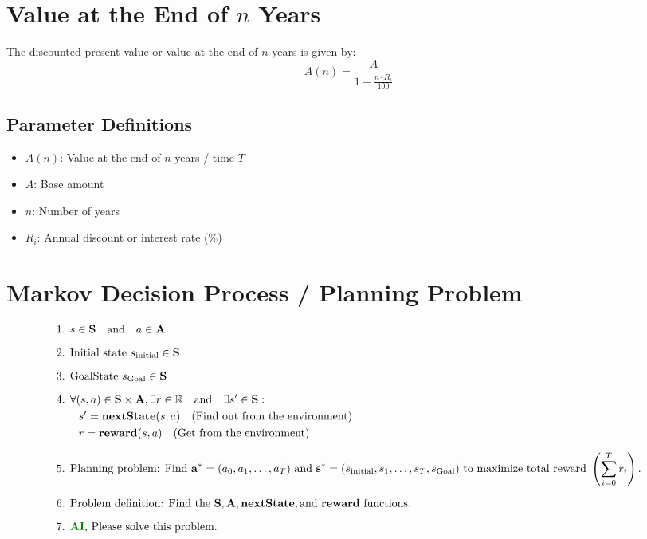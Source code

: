 \documentclass[11pt,a4paper]{article}
\begin{document}
\section{\texorpdfstring{Value at the End of $n$ Years}{Value at the End of n Years}}
The discounted present value or value at the end of $n$ years is given by:
\[
A(n) = \frac{A}{1 + \frac{n \cdot R_i}{100}}
\]

\subsection*{Parameter Definitions}
\begin{itemize}
    \item $A(n)$: Value at the end of $n$ years / time $T$
    \item $A$: Base amount
    \item $n$: Number of years
    \item $R_i$: Annual discount or interest rate (\%)
\end{itemize}

\clearpage
\endgroup

\begingroup
{}

\section*{Markov Decision Process / Planning Problem}

\[
\begin{aligned}
&\text{1. } s \in \mathbf{S} \quad \text{and} \quad a \in \mathbf{A} \\[6pt]
&\text{2. Initial state } s_{\text{initial}} \in \mathbf{S} \\[6pt]
&\text{3. GoalState } s_{\text{Goal}} \in \mathbf{S} \\[6pt]
&\text{4. } \forall (s, a) \in \mathbf{S} \times \mathbf{A}, \exists r \in \mathbb{R} \quad \text{and} \quad \exists s' \in \mathbf{S}: \\
&\qquad s' = \mathbf{nextState}(s, a) \quad \text{(Find out from the environment)} \\
&\qquad r = \mathbf{reward}(s, a) \quad \text{(Get from the environment)} \\[6pt]
&\text{5. Planning problem: Find } \mathbf{a}^* = (a_0, a_1, \dots, a_T) \text{ and } \mathbf{s}^* = (s_{\text{initial}}, s_1, \dots, s_T, s_{\text{Goal}}) \text{ to maximize total reward } \left(\sum_{i=0}^{T} r_i\right). \\[6pt]
&\text{6. Problem definition: Find the } \mathbf{S}, \mathbf{A}, \mathbf{nextState}, \text{and } \mathbf{reward} \text{ functions. } \\[6pt]
&\text{7. }\textcolor{thickgreen}{\textbf{AI}}\text{, Please solve this problem.}
\end{aligned}
\]
\end{document}
